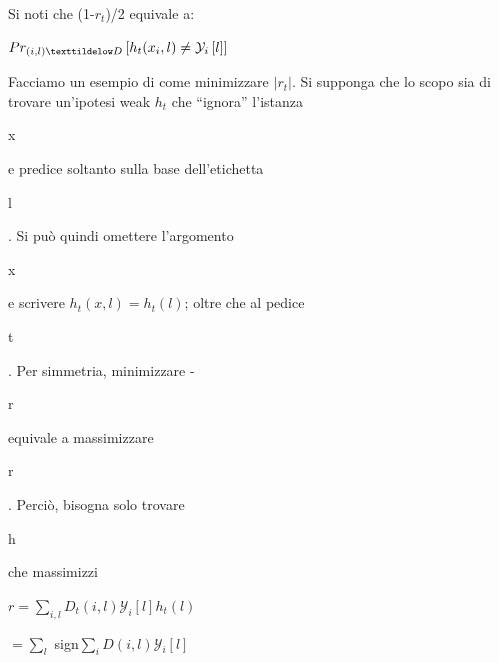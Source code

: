 Si noti che (1-\begin{math}
                r_t
               \end{math})/2 equivale a:
\begin{center}
 \begin{math}
  Pr_{(i,l)\texttildelow D}\left[h_t(x_i,l) \ne \mathcal{Y}_i\left[l\right]\right]
 \end{math}

\end{center}
Facciamo un esempio di come minimizzare \begin{math}
                                                          |r_t|
                                                         \end{math}. Si supponga che lo scopo sia di trovare 
un'ipotesi weak \begin{math}
                            h_t
                           \end{math} che ``ignora'' l'istanza \begin{it}x\end{it}
 e predice soltanto sulla base dell'etichetta \begin{it}l\end{it}. Si pu\`o quindi omettere l'argomento \begin{it}x\end{it}
 e scrivere \begin{math}
                                                             h_t(x,l) = h_t(l)
                                                            \end{math}; oltre che al pedice\begin{it}
                                                                                             t
                                                                                            \end{it}. 
Per simmetria, minimizzare -\begin{it}r\end{it} equivale a massimizzare \begin{it}r\end{it}. Perci\`o, bisogna 
solo trovare \begin{it}h\end{it} che massimizzi 
\begin{center}
 \begin{math}
  r = \sum_{i,l} D_t(i,l) \mathcal{Y}_i\left[l\right] h_t (l)
 \end{math}
\end{center}
  \begin{center}
 \begin{math}
  = \sum_l 
 \end{math} sign\begin{math}
                 \sum_i D(i,l) \mathcal{Y}_i\left[l\right]
                \end{math}

\end{center}



